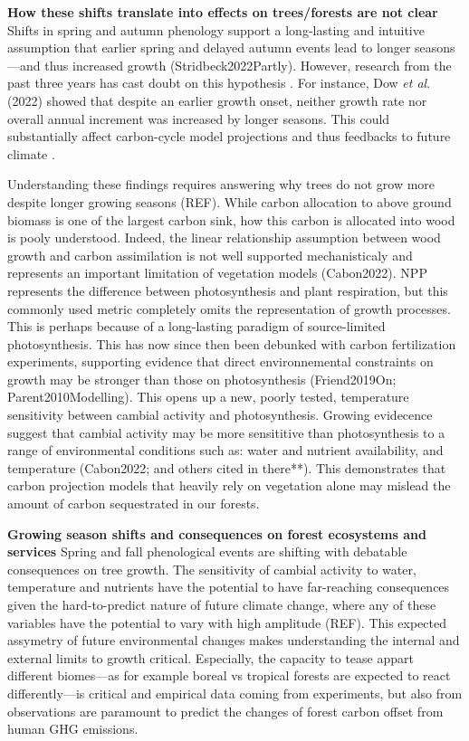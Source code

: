 \documentclass{article}
\begin{document}
\textbf{How these shifts translate into effects on trees/forests are not clear}
Shifts in spring and autumn phenology support a long-lasting and intuitive assumption that earlier spring and delayed autumn events lead to longer seasons---and thus increased growth \cite{keenan_net_2014} (Stridbeck2022Partly). However, research from the past three years has cast doubt on this hypothesis \cite{dow_warm_2022,green_limits_2022,silvestro_longer_2023}. For instance, Dow \textit{et al}. (2022) showed that despite an earlier growth onset, neither growth rate nor overall annual increment was increased by longer seasons. This could substantially affect carbon-cycle model projections and thus feedbacks to future climate \cite{richardson_climate_2013,swidrak_comparing_2013}. 

Understanding these findings requires answering why trees do not grow more despite longer growing seasons (REF). While carbon allocation to above ground biomass is one of the largest carbon sink, how this carbon is allocated into wood is pooly understood. Indeed, the linear relationship assumption between wood growth and carbon assimilation is not well supported mechanisticaly and represents an important limitation of vegetation models (Cabon2022). NPP represents the difference between photosynthesis and plant respiration, but this commonly used metric completely omits the representation of growth processes. This is perhaps because of a long-lasting paradigm of source-limited photosynthesis. This has now since then been debunked with carbon fertilization experiments, supporting evidence that direct environnemental constraints on growth may be stronger than those on photosynthesis (Friend2019On; Parent2010Modelling). This opens up a new, poorly tested, temperature sensitivity between cambial activity and photosynthesis. Growing evidecence suggest that cambial activity may be more sensititive than photosynthesis to a range of environmental conditions such as: water and nutrient availability, and temperature (Cabon2022; and others cited in there**). This demonstrates that carbon projection models that heavily rely on vegetation alone may mislead the amount of carbon sequestrated in our forests. 

\textbf{Growing season shifts and consequences on forest ecosystems and services}
Spring and fall phenological events are shifting with debatable consequences on tree growth. The sensitivity of cambial activity to water, temperature and nutrients have the potential to have far-reaching consequences given the hard-to-predict nature of future climate change, where any of these variables have the potential to vary with high amplitude (REF). This expected assymetry of future environmental changes makes understanding the internal and external limits to growth critical. Especially, the capacity to tease appart different biomes---as for example boreal vs tropical forests are expected to react differently---is critical and empirical data coming from experiments, but also from observations are paramount to predict the changes of forest carbon offset from human GHG emissions.  
\end{document}

